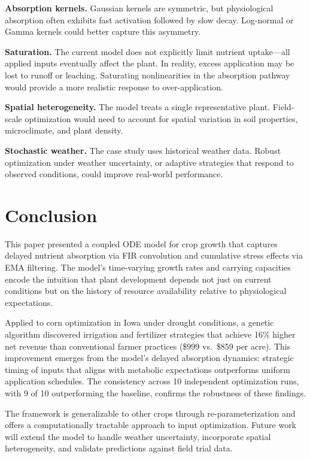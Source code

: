 \documentclass[preprint,12pt]{elsarticle}
\begin{document}
\textbf{Absorption kernels.} Gaussian kernels are symmetric, but physiological absorption often exhibits fast activation followed by slow decay. Log-normal or Gamma kernels could better capture this asymmetry.

\textbf{Saturation.} The current model does not explicitly limit nutrient uptake---all applied inputs eventually affect the plant. In reality, excess application may be lost to runoff or leaching. Saturating nonlinearities in the absorption pathway would provide a more realistic response to over-application.

\textbf{Spatial heterogeneity.} The model treats a single representative plant. Field-scale optimization would need to account for spatial variation in soil properties, microclimate, and plant density.

\textbf{Stochastic weather.} The case study uses historical weather data. Robust optimization under weather uncertainty, or adaptive strategies that respond to observed conditions, could improve real-world performance.

\section{Conclusion}\label{sec:conclusion}

This paper presented a coupled ODE model for crop growth that captures delayed nutrient absorption via FIR convolution and cumulative stress effects via EMA filtering. The model's time-varying growth rates and carrying capacities encode the intuition that plant development depends not just on current conditions but on the history of resource availability relative to physiological expectations.

Applied to corn optimization in Iowa under drought conditions, a genetic algorithm discovered irrigation and fertilizer strategies that achieve 16\% higher net revenue than conventional farmer practices (\$999 vs.\ \$859 per acre). This improvement emerges from the model's delayed absorption dynamics: strategic timing of inputs that aligns with metabolic expectations outperforms uniform application schedules. The consistency across 10 independent optimization runs, with 9 of 10 outperforming the baseline, confirms the robustness of these findings.

The framework is generalizable to other crops through re-parameterization and offers a computationally tractable approach to input optimization. Future work will extend the model to handle weather uncertainty, incorporate spatial heterogeneity, and validate predictions against field trial data. 
\end{document}

